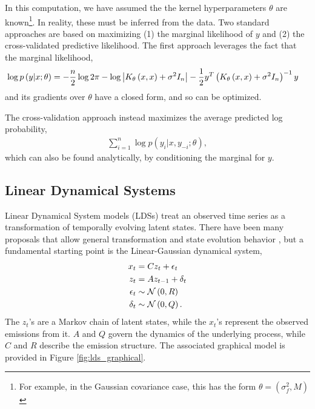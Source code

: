 In this computation, we have assumed the the kernel hyperparameters $\theta$ are
known\footnote{For example, in the Gaussian covariance case, this has the form
  $\theta = \left(\sigma_{f}^{2}, M\right)$}. In reality, these must be inferred
from the data. Two standard approaches are based on maximizing (1) the marginal
likelihood of $y$ and (2) the cross-validated predictive likelihood. The first
approach leverages the fact that the marginal likelihood,
\begin{align*}
  \log p\left(y \vert x; \theta\right) &= -\frac{n}{2}\log 2\pi - \log\left|K_{\theta}\left(x, x\right) + \sigma^{2}I_{n}\right| - \frac{1}{2}y^{T}\left(K_{\theta}\left(x, x\right) + \sigma^{2}I_{n}\right)^{-1}y
\end{align*}
and its gradients over $\theta$ have a closed form, and so can be optimized.

The cross-validation approach instead maximizes the average predicted log probability,
\begin{align*}
\sum_{i = 1}^{n} \log p\left(y_{i} \vert x, y_{-i}; \theta\right),
\end{align*}
which can also be found analytically, by conditioning the marginal for $y$.


\subsection{Linear Dynamical Systems}
\label{subsec:linear_dynamical_systems}

Linear Dynamical System models (LDSs) treat an observed time series as a
transformation of temporally evolving latent states.
There have been many proposals that allow general transformation and state
evolution behavior \citep{hostetler1983nonlinear, wan2000unscented}, but a
fundamental starting point is the Linear-Gaussian dynamical system,
\begin{align*}
  x_{t} &= C z_{t} + \epsilon_{t} \\
  z_{t} &= A z_{t - 1} + \delta_{t} \\
  \epsilon_{t} &\sim \mathcal{N}\left(0, R\right) \\
  \delta_{t} &\sim \mathcal{N}\left(0, Q\right).
\end{align*}
The $z_{t}$'s are a Markov chain of latent states, while the $x_{t}$'s represent
the observed emissions from it. $A$ and $Q$ govern the dynamics of the
underlying process, while $C$ and $R$ describe the emission structure. The
associated graphical model is provided in Figure \ref{fig:lds_graphical}.

